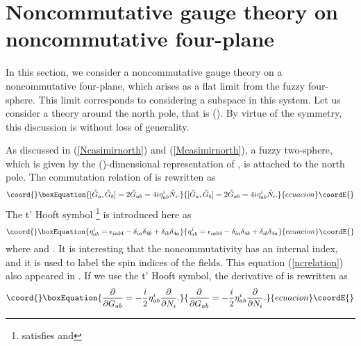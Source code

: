 \documentclass[a4paper,11pt]{article}
\begin{document}

\section{Noncommutative gauge theory on noncommutative four-plane}
\hspace{0.4cm}
In this section, 
we consider a noncommutative gauge theory 
on a noncommutative four-plane, which arises as a flat limit 
from the fuzzy four-sphere. 
This limit corresponds to considering a subspace in this system. 
Let us consider a theory around the north pole, 
that is \coordHE{} 
(\coordHE{}). 
By virtue of the \coordHE{} symmetry, this discussion is 
without loss of generality. 

As discussed in (\ref{Ncasimirnorth}) and 
(\ref{Mcasimirnorth}), a fuzzy two-sphere, 
which is given by the (\coordHE{})-dimensional representation 
of \coordHE{}, 
is attached 
to the north pole. 
The commutation relation of \coordHE{} 
is rewritten as 
\begin{equation}\coord{}\boxEquation{
[\hat{G}_{a},\hat{G}_{b}]=2\hat{G}_{ab}
=4i\eta_{ab}^{i}\hat{N}_{i}. 
\label{ncrelation}
}{
[\hat{G}_{a},\hat{G}_{b}]=2\hat{G}_{ab}
=4i\eta_{ab}^{i}\hat{N}_{i}. 
}{ecuacion}\coordE{}\end{equation}
The t' Hooft symbol \coordHE{}
\footnote{
\coordHE{} satisfies 
\coordHE{} and 
\coordHE{} 
} 
is introduced here as 
\begin{equation}\coord{}\boxEquation{
\eta_{ab}^{i}=\epsilon_{iab4}-\delta_{ia}\delta_{4b}
+\delta_{ib}\delta_{4a}
}{
\eta_{ab}^{i}=\epsilon_{iab4}-\delta_{ia}\delta_{4b}
+\delta_{ib}\delta_{4a}
}{ecuacion}\coordE{}\end{equation}
where \coordHE{} and \coordHE{}. 
It is interesting that 
the noncommutativity has an internal \coordHE{} index, 
and it is used to label the spin indices of the fields. 
This equation (\ref{ncrelation}) also appeared in \cite{zhanghu}. 
If we use the t' Hooft symbol, the derivative of \coordHE{} is rewritten as 
\begin{equation}\coord{}\boxEquation{
\frac{\partial}{\partial G_{ab}}=-\frac{i}{2}\eta_{ab}^{i}
\frac{\partial}{\partial N_{i}}.
}{
\frac{\partial}{\partial G_{ab}}=-\frac{i}{2}\eta_{ab}^{i}
\frac{\partial}{\partial N_{i}}.
}{ecuacion}\coordE{}\end{equation}
\end{document}
